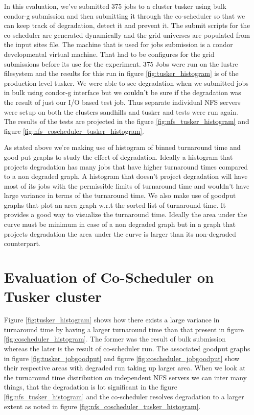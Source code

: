 \documentclass[ms,electronic,double]{nuthesis}
\begin{document}
In this evaluation, we've submitted 375 jobs to a cluster tusker using bulk 
condor-g submission and then submitting it through the co-scheduler so that we 
can keep track of degradation, detect it and prevent it. The submit scripts for 
the co-scheduler are generated dynamically and the grid universes are populated 
from the input sites file. The machine that is used for jobs submission is a 
condor developmental virtual machine. That had to be configures for the grid 
submissions before its use for the experiment. 375 Jobs were run on the lustre 
filesystem and the results for this run in figure \ref{fig:tusker_histogram} is 
of the production level tusker. We were able to see degradation when we 
submitted jobs in bulk using condor-g interface but we couldn't be sure if the 
degradation was the result of just our I/O based test job. Thus separate 
individual NFS servers were setup on both the clusters sandhills and tusker and 
tests were run again. The results of the tests are projected in the figure \ref{fig:nfs_tusker_histogram} 
and figure \ref{fig:nfs_coscheduler_tusker_histogram}.

As stated above we're making use of histogram of binned turnaround time and good 
put graphs to study the effect of degradation. Ideally a histogram that projects 
degradation has many jobs that have higher turnaround times compared to a non 
degraded graph. A histogram that doesn't project degradation will have most of 
its jobs with the permissible limits of turnaround time and wouldn't have large 
variance in terms of the turnaround time. We also make use of goodput graphs 
that plot an area graph w.r.t the sorted list of turnaround time. It provides a good way to 
visualize the turnaround time. Ideally the area under the curve must be minimum 
in case of a non degraded graph but in a graph that projects degradation the 
area under the curve is larger than its non-degraded counterpart.
\newpage
\section{Evaluation of Co-Scheduler on Tusker cluster}
Figure \ref{fig:tusker_histogram} shows how there exists a large variance in 
turnaround time by having a larger turnaround time than that present in figure 
\ref{fig:coscheduler_histogram}. The former was the result of bulk submission 
whereas the later is the result of co-scheduler run. The associated goodput 
graphs in figure \ref{fig:tusker_jobgoodput} and figure \ref{fig:coscheduler_jobgoodput} 
show their respective areas with degraded run taking up larger area. When we look 
at the turnaround time distribution on independent NFS servers we can inter many 
things, that the degradation is lot significant in the figure \ref{fig:nfs_tusker_histogram} and the co-scheduler 
resolves degradation to a larger extent as noted in figure 
\ref{fig:nfs_coscheduler_tusker_histogram}.
\end{document}
